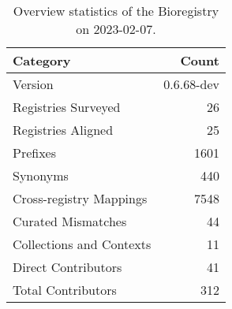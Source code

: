 \begin{table}
\centering
\caption{Overview statistics of the Bioregistry on 2023-02-07.}
\label{tab:bioregistry-summary}
\begin{tabular}{lr}
\toprule
                Category &      Count \\
\midrule
                 Version & 0.6.68-dev \\
     Registries Surveyed &         26 \\
      Registries Aligned &         25 \\
                Prefixes &       1601 \\
                Synonyms &        440 \\
 Cross-registry Mappings &       7548 \\
      Curated Mismatches &         44 \\
Collections and Contexts &         11 \\
     Direct Contributors &         41 \\
      Total Contributors &        312 \\
\bottomrule
\end{tabular}
\end{table}
